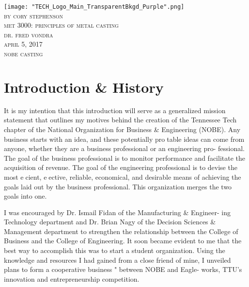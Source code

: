 \documentclass{article}
\begin{document}
\begin{titlepage}
	\begin{center}
	\texttt{[image: "TECH\_Logo\_Main\_TransparentBkgd\_Purple".png]} \\
	[2mm]
	\textsc{\Large by cory stephenson} \\
	[0.75cm]
	\textsc{\Large met 3000: principles of metal casting} \\
	[0.75cm]
	\textsc{\Large dr. fred vondra} \\
	[0.75cm]
	\textsc{\Large april 5, 2017} \\
	[0.75cm]
	\textsc{\Large nobe casting}\\
	
	
	 \end{center}
        
\end{titlepage}

\tableofcontents
\thispagestyle{empty}
\cleardoublepage

\vfill
\begin{landscape}


\end{landscape}

\section{Introduction & History}

It is my intention that this introduction will serve as a generalized mission
statement that outlines my motives behind the creation of the Tennessee Tech
chapter of the National Organization for Business & Engineering (NOBE). Any
business  starts  with  an  idea,  and  these  potentially  protable  ideas  can  come
from anyone,  whether they are a business professional or an engineering pro-
fessional.  The goal of the business professional is to monitor performance and
facilitate the acquisition of revenue.  The goal of the engineering professional is
to devise the most ecient, eective, reliable, economical, and desirable means
of achieving the goals laid out by the business professional.  This organization
merges the two goals into one.

I  was  encouraged  by  Dr.   Ismail  Fidan  of  the  Manufacturing  &  Engineer-
ing  Technology  department  and  Dr.   Brian  Nagy  of  the  Decision  Sciences  &
Management department to strengthen the relationship between the College of
Business and the College of Engineering.  It soon became evident to me that
the best way to accomplish this was to start a student organization.  Using the
knowledge and resources I had gained from a close friend of mine,  I unveiled
plans  to  form  a  cooperative  business  \incubator"  between  NOBE  and  Eagle-
works, TTU's innovation and entrepreneurship competition.
\end{document}
